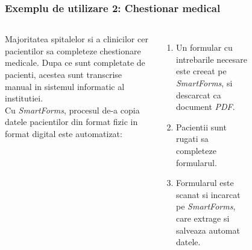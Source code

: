 \documentclass[9pt]{beamer}
\begin{document}
\begin{frame}
	\frametitle{Exemplu de utilizare 2: Chestionar medical}
	\begin{columns}
		Majoritatea spitalelor si a clinicilor cer pacientilor sa completeze chestionare medicale. Dupa ce sunt completate de pacienti, acestea sunt transcrise manual in sistemul informatic al institutiei.\\
		\vspace{10pt}
		Cu \textit{SmartForms}, procesul de-a copia datele pacientilor din format fizic in format digital este automatizat:
		\begin{enumerate}
			\item Un formular cu intrebarile necesare este creeat pe \textit{SmartForms}, si descarcat ca document \textit{PDF}.
			\item Pacientii sunt rugati sa completeze formularul.
			\item Formularul este scanat si incarcat pe \textit{SmartForms}, care extrage si salveaza automat datele.
		\end{enumerate}
		\begin{figure}[!h]
			\centering
		\end{figure}
	\end{columns}
\end{frame}
\end{document}
